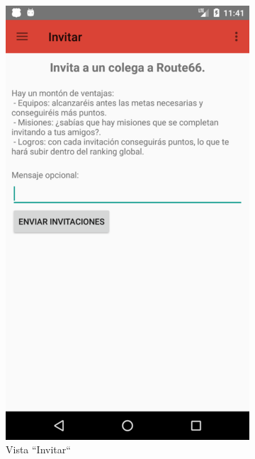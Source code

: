 \documentclass[twoside]{report}
\begin{document}
\begin{figure}[H]
\begin{center}
	\begin{subfigure}[t]{.3\linewidth}
		\includegraphics[scale=0.2]{images/userguide/11.png}
		\caption{Vista “Invitar“}
	\end{subfigure}\hspace{2mm}%
	\begin{subfigure}[t]{.3\linewidth}

\end{subfigure}
\end{center}
\end{figure}
\end{document}
